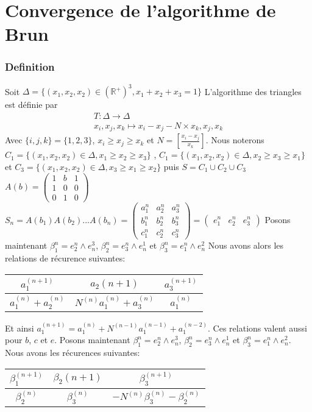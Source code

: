 \documentclass[12pt]{article}
\theoremstyle{plain}%
\theoremstyle{definition}
\theoremstyle{remark}
\begin{document}
\part*{Convergence de l'algorithme de Brun}
\section{Definition}

Soit $\Delta=\{(x_1,x_2,x_2) \in (\mathbb{R}^+)^3,x_1+x_2+x_3=1\} $ L'algorithme des triangles est définie par \[
\begin{array}{c}
T:\Delta \to \Delta \\
x_i,x_j,x_k \mapsto x_i-x_j-N \times x_k,x_j,x_k
\end{array}
\]
Avec $\{i,j,k\}=\{1,2,3\}$, $x_i\geq x_j \geq x_k$ et $N=[\frac{x_i-x_j}{x_k}]$.
Nous noterons $C_1=\{ (x_1,x_2,x_2) \in \Delta, x_1\geq x_2 \geq x_3\}$ , $C_1=\{ (x_1,x_2,x_2) \in \Delta, x_2 \geq x_3 \geq x_1\}$ et $C_3=\{ (x_1,x_2,x_2) \in \Delta, x_3 \geq x_1 \geq x_2\}$ puis $S=C_1 \cup C_2 \cup C_3$
$A(b)=\begin{pmatrix}1 & b & 1 \\ 1 & 0 & 0 \\ 0 & 1 & 0 \end{pmatrix}$\newline
$S_n=A(b_1)A(b_2)...A(b_n)=\begin{pmatrix}a_1^n & a_2^n & a_3^n \\ b_1^n & b_2^n & b_3^n \\ c_1^n & c_2^n & c_3^n \end{pmatrix} = \left ( \begin{array}{c|c|c} e_1^n & e_2^n & e_3^n \end{array} \right ) $\newline
Posons maintenant $\beta_1^n=e_2^n \land e^3_n$, $\beta_2^n=e_3^n \land e^1_n$ et $\beta_3^n=e_1^n \land e^2_n$
Nous avons alors les relations de récurence suivantes:
\begin{center}
\begin{tabular}{c|c|c}
$a_1^{(n+1)}$ & $a_2{(n+1)}$ & $a_3^{(n+1)}$\\
\hline
$a_1^{(n)}+a_2^{(n)}$ & $N^{(n)} a_1^{(n)}+a_3^{(n)}$ & $a_1^{(n)}$ \\
\end{tabular}
\end{center}
Et ainsi $a_1^{(n+1)}=a_1^{(n)}+N^{(n-1)} a_1^{(n-1)}+a_1^{(n-2)}$.\newline
Ces relations valent aussi pour $b$, $c$ et $e$.
Posons maintenant $\beta_1^n=e_2^n \land e^3_n$, $\beta_2^n=e_3^n \land e^1_n$ et $\beta_3^n=e_1^n \land e^2_n$. Nous avons les récurences suivantes:
\begin{center}
\begin{tabular}{c|c|c}
$\beta_1^{(n+1)}$ & $\beta_2{(n+1)}$ & $\beta_3^{(n+1)}$\\
\hline
$\beta_2^{(n)}$ & $\beta_3^{(n)}$ & $-N^{(n)} \beta_3^{(n)}-\beta_2^{(n)}$
\end{tabular}
\end{center}
\end{document}

